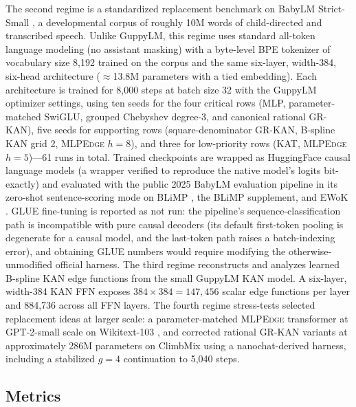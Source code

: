 \documentclass{article}
\newcommand{\modelname}[1]{\textsc{#1}}
\newcommand{\grkan}{\modelname{GR-KAN}}
\newcommand{\mlpedge}{\modelname{MLPEdge}}
\begin{document}
The second regime is a standardized replacement benchmark on BabyLM Strict-Small \citep{warstadt2023babylm}, a developmental corpus of roughly 10M words of child-directed and transcribed speech. Unlike GuppyLM, this regime uses standard all-token language modeling (no assistant masking) with a byte-level BPE tokenizer of vocabulary size 8,192 trained on the corpus and the same six-layer, width-384, six-head architecture (\(\approx\)13.8M parameters with a tied embedding). Each architecture is trained for 8,000 steps at batch size 32 with the GuppyLM optimizer settings, using ten seeds for the four critical rows (MLP, parameter-matched SwiGLU, grouped Chebyshev degree-3, and canonical rational \grkan{}), five seeds for supporting rows (square-denominator \grkan{}, B-spline KAN grid 2, \mlpedge{} \(h=8\)), and three for low-priority rows (KAT, \mlpedge{} \(h=5\))---61 runs in total. Trained checkpoints are wrapped as HuggingFace causal language models (a wrapper verified to reproduce the native model's logits bit-exactly) and evaluated with the public 2025 BabyLM evaluation pipeline \citep{babylm2025eval} in its zero-shot sentence-scoring mode on BLiMP \citep{warstadt2020blimp}, the BLiMP supplement, and EWoK \citep{ivanova2024ewok}. GLUE fine-tuning is reported as not run: the pipeline's sequence-classification path is incompatible with pure causal decoders (its default first-token pooling is degenerate for a causal model, and the last-token path raises a batch-indexing error), and obtaining GLUE numbers would require modifying the otherwise-unmodified official harness. The third regime reconstructs and analyzes learned B-spline KAN edge functions from the small GuppyLM KAN model. A six-layer, width-384 KAN FFN exposes \(384\times384=147{,}456\) scalar edge functions per layer and 884,736 across all FFN layers. The fourth regime stress-tests selected replacement ideas at larger scale: a parameter-matched \mlpedge{} transformer at GPT-2-small scale \citep{radford2019language} on Wikitext-103 \citep{merity2017pointer}, and corrected rational \grkan{} variants at approximately 286M parameters on ClimbMix using a nanochat-derived harness, including a stabilized \(g=4\) continuation to 5,040 steps.

\subsection{Metrics}
\end{document}
